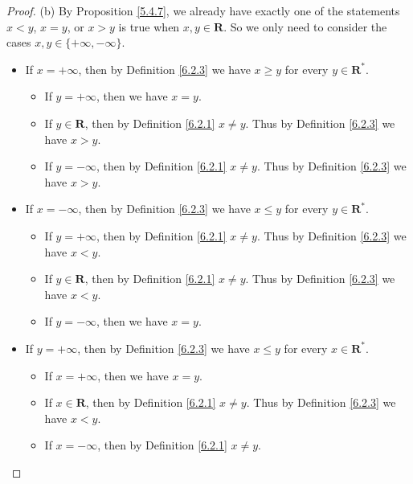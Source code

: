 \begin{proof}{(b)}
    By Proposition \ref{5.4.7}, we already have exactly one of the statements \(x < y\), \(x = y\), or \(x > y\) is true when \(x, y \in \mathbf{R}\).
    So we only need to consider the cases \(x, y \in \{+\infty, -\infty\}\).
    \begin{itemize}
        \item If \(x = +\infty\), then by Definition \ref{6.2.3} we have \(x \geq y\) for every \(y \in \mathbf{R}^*\).
              \begin{itemize}
                  \item If \(y = +\infty\), then we have \(x = y\).
                  \item If \(y \in \mathbf{R}\), then by Definition \ref{6.2.1} \(x \neq y\).
                        Thus by Definition \ref{6.2.3} we have \(x > y\).
                  \item If \(y = -\infty\), then by Definition \ref{6.2.1} \(x \neq y\).
                        Thus by Definition \ref{6.2.3} we have \(x > y\).
              \end{itemize}
        \item If \(x = -\infty\), then by Definition \ref{6.2.3} we have \(x \leq y\) for every \(y \in \mathbf{R}^*\).
              \begin{itemize}
                  \item If \(y = +\infty\), then by Definition \ref{6.2.1} \(x \neq y\).
                        Thus by Definition \ref{6.2.3} we have \(x < y\).
                  \item If \(y \in \mathbf{R}\), then by Definition \ref{6.2.1} \(x \neq y\).
                        Thus by Definition \ref{6.2.3} we have \(x < y\).
                  \item If \(y = -\infty\), then we have \(x = y\).
              \end{itemize}
        \item If \(y = +\infty\), then by Definition \ref{6.2.3} we have \(x \leq y\) for every \(x \in \mathbf{R}^*\).
              \begin{itemize}
                  \item If \(x = +\infty\), then we have \(x = y\).
                  \item If \(x \in \mathbf{R}\), then by Definition \ref{6.2.1} \(x \neq y\).
                        Thus by Definition \ref{6.2.3} we have \(x < y\).
                  \item If \(x = -\infty\), then by Definition \ref{6.2.1} \(x \neq y\).

\end{itemize}
\end{itemize}
\end{proof}
